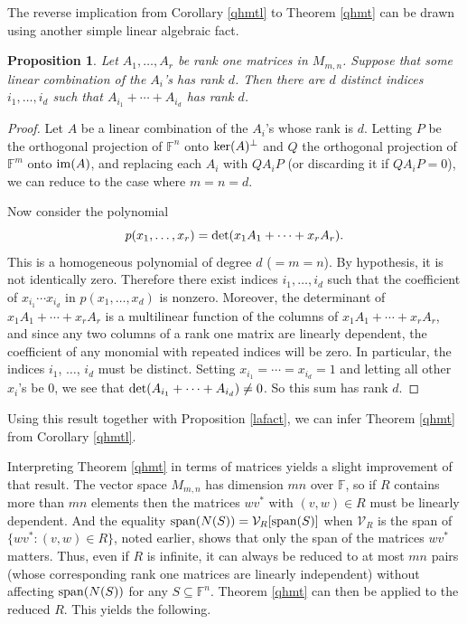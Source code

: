\documentclass{amsart}
\newtheorem{prop}[thm]{Proposition}
\theoremstyle{definition}
\begin{document}
The reverse implication from Corollary \ref{qhmtl} to  Theorem \ref{qhmt} can be drawn using another simple linear algebraic fact.

\begin{prop}\label{lafact2}
Let $A_1, \ldots, A_r$ be rank one matrices in $M_{m,n}$. Suppose that some linear combination of the $A_i$'s has rank $d$. Then there are $d$ distinct indices $i_1, \ldots, i_d$ such that $A_{i_1} + \cdots + A_{i_d}$ has rank $d$.
\end{prop}

\begin{proof}
Let $A$ be a linear combination of the $A_i$'s whose rank is $d$. Letting $P$ be the orthogonal projection of $\mathbb{F}^n$ onto ${\rm ker}(A)^\perp$ and $Q$ the orthogonal projection of $\mathbb{F}^m$ onto ${\rm im}(A)$, and replacing each $A_i$ with $QA_iP$ (or discarding it if $QA_iP = 0$), we can reduce to the case where $m = n = d$.

Now consider the polynomial $$p(x_1, \ldots, x_r) = {\rm det}(x_1A_1 + \cdots + x_rA_r).$$ This is a homogeneous polynomial of degree $d$ ($= m = n$). By hypothesis, it is not identically zero. Therefore there exist indices $i_1, \ldots, i_d$ such that the coefficient of $x_{i_1}\cdots x_{i_d}$ in $p(x_1, \ldots, x_d)$ is nonzero. Moreover, the determinant of $x_1A_1 + \cdots + x_rA_r$ is a multilinear function of the columns of $x_1A_1 + \cdots + x_rA_r$, and since any two columns of a rank one matrix are linearly dependent, the coefficient of any monomial with repeated indices will be zero. In particular, the indices $i_1$, $\ldots$, $i_d$ must be distinct. Setting $x_{i_1} = \cdots = x_{i_d} = 1$ and letting all other $x_i$'s be $0$, we see that ${\rm det}(A_{i_1} + \cdots + A_{i_d}) \neq 0$. So this sum has rank $d$.
\end{proof}

Using this result together with Proposition \ref{lafact}, we can infer Theorem \ref{qhmt} from Corollary \ref{qhmtl}.

Interpreting Theorem \ref{qhmt} in terms of matrices yields a slight improvement of that result. The vector space $M_{m,n}$ has dimension $mn$ over $\mathbb{F}$, so if $R$ contains more than $mn$ elements then the matrices $wv^*$ with $(v,w) \in R$ must be linearly dependent. And the equality ${\rm span}(N(S)) = \mathcal{V}_R[{\rm span}(S)]$ when $\mathcal{V}_R$ is the span of $\{wv^*: (v,w) \in R\}$, noted earlier, shows that only the span of the matrices $wv^*$ matters. Thus, even if $R$ is infinite, it can always be reduced to at most $mn$ pairs (whose corresponding rank one matrices are linearly independent) without affecting ${\rm span}(N(S))$ for any $S \subseteq \mathbb{F}^n$. Theorem \ref{qhmt} can then be applied to the reduced $R$. This yields the following.
\end{document}
